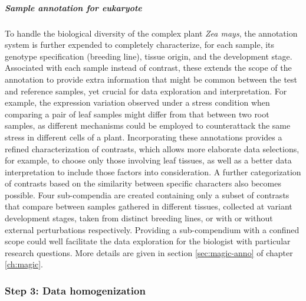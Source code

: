 \subparagraph{Sample annotation for eukaryote} 
To handle the biological diversity of the complex plant \textit{Zea mays}, the annotation system is further expended to completely characterize, for each sample, its genotype specification (breeding line), tissue origin, and the development stage. Associated with each sample instead of contrast, these extends the scope of the  annotation to provide extra information that might be common between  the test and reference samples, yet crucial for data exploration and  interpretation. For example, the expression variation observed under a stress condition when  comparing a pair of leaf samples might differ from that between two root  samples, as different mechanisms could be employed to counterattack the same  stress in different cells of a plant.  Incorporating these annotations provides a refined characterization of  contrasts, which allows more elaborate data selections, for example, to choose  only those involving leaf tissues, as well as a better data interpretation to  include those factors into consideration. A further categorization of contrasts based on the similarity between specific  characters also becomes possible.  Four sub-compendia are created containing  only a subset of contrasts that compare between samples gathered in different  tissues, collected at variant development stages, taken from distinct breeding  lines, or with or without external perturbations respectively. Providing a sub-compendium with a confined scope could well facilitate the data  exploration for the biologist with particular research questions. More details are given in section \ref{sec:magic-anno} of chapter  \ref{ch:magic}.









\subsubsection{Step 3: Data homogenization}


